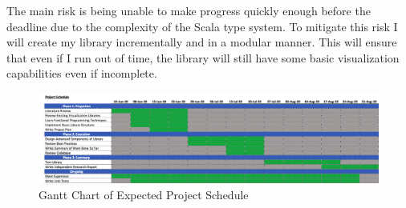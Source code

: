 \documentclass[12pt]{article}
\begin{document}
The main risk is being unable to make progress quickly enough before the deadline due to the complexity of the Scala type system. To mitigate this risk I will create my library incrementally and in a modular manner. This will ensure that even if I run out of time, the library will still have some basic visualization capabilities even if incomplete.

\pagebreak
\begin{landscape}
	
\begin{figure}[h]
\begin{center}
\includegraphics[scale=0.65]{Gantt}
\end{center}
\caption{Gantt Chart of Expected Project Schedule}
\end{figure}

\end{landscape}
\pagebreak
\printbibliography
\end{document}
